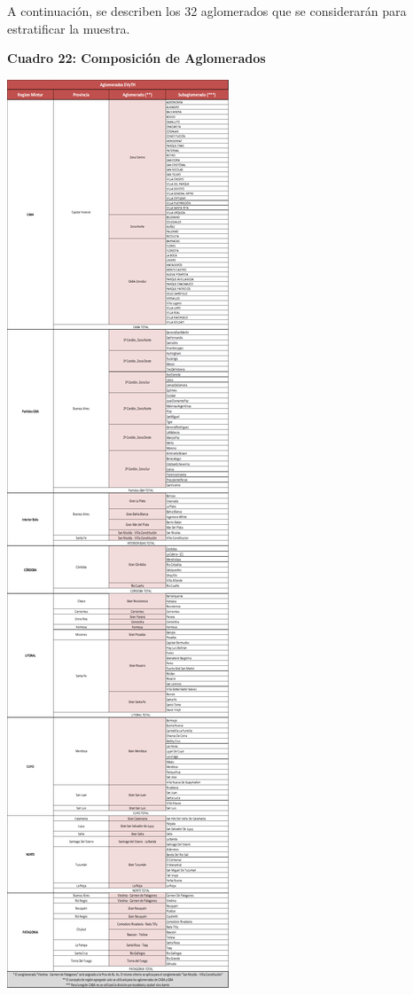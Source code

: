 \documentclass[
  openany]{book}
\begin{document}
A continuación, se describen los 32 aglomerados que se considerarán para estratificar la muestra.

\textbf{Cuadro 22: Composición de Aglomerados}

\includegraphics{cuadros_graficos/10_aglomerados.png}
\end{document}
